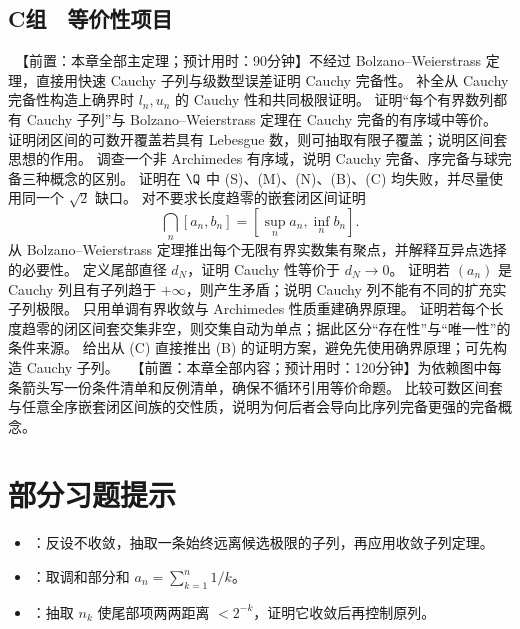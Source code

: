 \subsection*{C组　等价性项目}
\begin{enumerate}[label=\textbf{6.\arabic*.},resume]
  \projectdo\ 【前置：本章全部主定理；预计用时：90分钟】不经过 Bolzano--Weierstrass 定理，直接用快速 Cauchy 子列与级数型误差证明 Cauchy 完备性。
  \mustdo 补全从 Cauchy 完备性构造上确界时 \(l_n,u_n\) 的 Cauchy 性和共同极限证明。
  \mustdo 证明“每个有界数列都有 Cauchy 子列”与 Bolzano--Weierstrass 定理在 Cauchy 完备的有序域中等价。
  \optionaldo 证明闭区间的可数开覆盖若具有 Lebesgue 数，则可抽取有限子覆盖；说明区间套思想的作用。
  \opendo 调查一个非 Archimedes 有序域，说明 Cauchy 完备、序完备与球完备三种概念的区别。
  \mustdo 证明在 \(\Q\) 中 (S)、(M)、(N)、(B)、(C) 均失败，并尽量使用同一个 \(\sqrt2\) 缺口。
  \mustdo 对不要求长度趋零的嵌套闭区间证明
 \[
  \bigcap_n[a_n,b_n]=[\sup_n a_n,\inf_n b_n].
 \]
  \mustdo 从 Bolzano--Weierstrass 定理推出每个无限有界实数集有聚点，并解释互异点选择的必要性。
  \mustdo 定义尾部直径 \(d_N\)，证明 Cauchy 性等价于 \(d_N\to0\)。
  \mustdo 证明若 \((a_n)\) 是 Cauchy 列且有子列趋于 \(+\infty\)，则产生矛盾；说明 Cauchy 列不能有不同的扩充实子列极限。
  \mustdo 只用单调有界收敛与 Archimedes 性质重建确界原理。
  \mustdo 证明若每个长度趋零的闭区间套交集非空，则交集自动为单点；据此区分“存在性”与“唯一性”的条件来源。
  \optionaldo 给出从 (C) 直接推出 (B) 的证明方案，避免先使用确界原理；可先构造 Cauchy 子列。
  \projectdo\ 【前置：本章全部内容；预计用时：120分钟】为依赖图中每条箭头写一份条件清单和反例清单，确保不循环引用等价命题。
  \opendo 比较可数区间套与任意全序嵌套闭区间族的交性质，说明为何后者会导向比序列完备更强的完备概念。
\end{enumerate}

\section*{部分习题提示}
\begin{itemize}
 \item {}：反设不收敛，抽取一条始终远离候选极限的子列，再应用收敛子列定理。
 \item {}：取调和部分和 \(a_n=\sum_{k=1}^n1/k\)。
 \item {}：抽取 \(n_k\) 使尾部项两两距离 \(<2^{-k}\)，证明它收敛后再控制原列。
\end{itemize}

